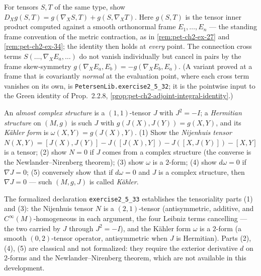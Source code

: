 \begin{remark}
  \label{rem:pet-ch2-ex-32}
  \leanok
  For tensors $S,T$ of the same type, show
  $D_Xg(S,T)=g(\nabla_XS,T)+g(S,\nabla_XT)$. Here $g(S,T)$ is the tensor inner
  product computed against a smooth orthonormal frame $E_1,\dots,E_n$ — the
  standing frame convention of the metric contraction, as in
  \cref{rem:pet-ch2-ex-27} and \cref{rem:pet-ch2-ex-34}; the identity then holds
  at \emph{every} point. The connection cross terms $S(\dots,\nabla_XE_a,\dots)$
  do not vanish individually but cancel in pairs by the frame skew-symmetry
  $g(\nabla_XE_a,E_b)=-g(\nabla_XE_b,E_a)$. (A variant proved at a frame that is
  covariantly \emph{normal} at the evaluation point, where each cross term
  vanishes on its own, is \texttt{PetersenLib.exercise2\_5\_32}; it is the
  pointwise input to the Green identity of Prop.~2.2.8,
  \cref{prop:pet-ch2-adjoint-integral-identity}.)
\end{remark}

\begin{remark}
  \label{rem:pet-ch2-ex-33}
  \leanok
  An \emph{almost complex structure} is a $(1,1)$-tensor $J$ with $J^2=-I$; a
  \emph{Hermitian structure} on $(M,g)$ is such $J$ with
  $g(J(X),J(Y))=g(X,Y)$, and its \emph{K\"ahler form} is
  $\omega(X,Y)=g(J(X),Y)$. (1) Show the \emph{Nijenhuis tensor}
  $N(X,Y)=[J(X),J(Y)]-J([J(X),Y])-J([X,J(Y)])-[X,Y]$ is a tensor; (2) show
  $N=0$ if $J$ comes from a complex structure (the converse is the
  Newlander–Nirenberg theorem); (3) show $\omega$ is a $2$-form; (4) show
  $d\omega=0$ if $\nabla J=0$; (5) conversely show that if $d\omega=0$ and $J$
  is a complex structure, then $\nabla J=0$ — such $(M,g,J)$ is called
  \emph{K\"ahler}.

  The formalized declaration \texttt{exercise2\_5\_33} establishes the
  tensoriality parts (1) and (3): the Nijenhuis tensor $N$ is a $(2,1)$-tensor
  (antisymmetric, additive, and $C^\infty(M)$-homogeneous in each argument, the
  four Leibniz terms cancelling — the two carried by $J$ through $J^2=-I$), and
  the K\"ahler form $\omega$ is a $2$-form (a smooth $(0,2)$-tensor operator,
  antisymmetric when $J$ is Hermitian). Parts (2), (4), (5) are classical and
  not formalized: they require the exterior derivative $d$ on $2$-forms and the
  Newlander–Nirenberg theorem, which are not available in this development.
\end{remark}


